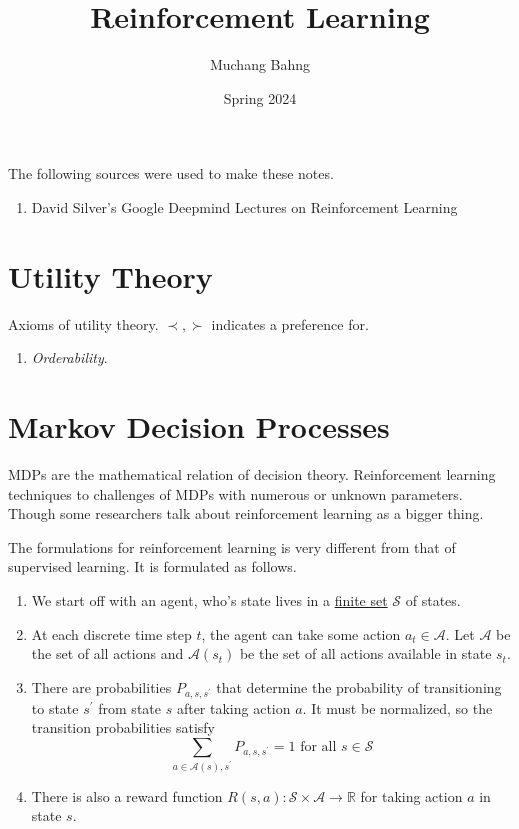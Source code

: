 \documentclass{article}
\begin{document}
\title{Reinforcement Learning}
\author{Muchang Bahng}
\date{Spring 2024}

\maketitle
\tableofcontents
\pagebreak

The following sources were used to make these notes. 
\begin{enumerate}
  \item David Silver's Google Deepmind Lectures on Reinforcement Learning 
\end{enumerate}

\section{Utility Theory} 

  Axioms of utility theory. $\prec, \succ$ indicates a preference for.  
  \begin{enumerate}
    \item \textit{Orderability}. 
  \end{enumerate}

\section{Markov Decision Processes}

  MDPs are the mathematical relation of decision theory. Reinforcement learning techniques to challenges of MDPs with numerous or unknown parameters. Though some researchers talk about reinforcement learning as a bigger thing. 

  \begin{definition}
    \label{def:state-space}
    The formulations for reinforcement learning is very different from that of supervised learning. It is formulated as follows. 
    \begin{enumerate}
      \item We start off with an agent, who's state lives in a \hyperref[st-def:finite-set]{finite set} $\mathcal{S}$ of states. 
      \item At each discrete time step $t$, the agent can take some action $a_t \in \mathcal{A}$. Let $\mathcal{A}$ be the set of all actions and $\mathcal{A}(s_t)$ be the set of all actions available in state $s_t$. 
      \item There are probabilities $P_{a, s, s^\prime}$ that determine the probability of transitioning to state $s^\prime$ from state $s$ after taking action $a$. It must be normalized, so the transition probabilities satisfy 
        \begin{equation}
          \sum_{a \in \mathcal{A}(s), s^\prime} P_{a, s, s^\prime} = 1 \text{ for all } s \in \mathcal{S}
        \end{equation}
      \item There is also a reward function $R(s, a): \mathcal{S} \times \mathcal{A} \rightarrow \mathbb{R}$ for taking action $a$ in state $s$. 
    \end{enumerate}
  \end{definition}
\end{document}
